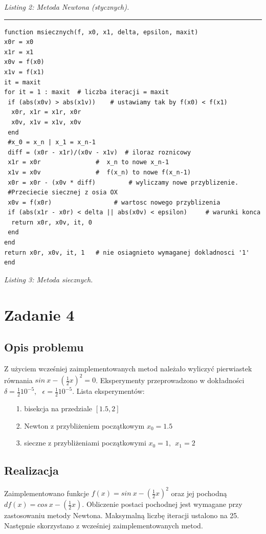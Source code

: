 \documentclass[]{article}
\begin{document}
\textit{Listing 2: Metoda Newtona (stycznych).}
\newpage
\hrule
\begin{lstlisting}
function msiecznych(f, x0, x1, delta, epsilon, maxit)
x0r = x0
x1r = x1
x0v = f(x0)         
x1v = f(x1)  
it = maxit    
for it = 1 : maxit	# liczba iteracji = maxit
 if (abs(x0v) > abs(x1v))    # ustawiamy tak by f(x0) < f(x1) 
  x0r, x1r = x1r, x0r 
  x0v, x1v = x1v, x0v 
 end 
 #x_0 = x_n | x_1 = x_n-1
 diff = (x0r - x1r)/(x0v - x1v)  # iloraz roznicowy
 x1r = x0r               #  x_n to nowe x_n-1
 x1v = x0v               #  f(x_n) to nowe f(x_n-1)
 x0r = x0r - (x0v * diff)         # wyliczamy nowe przyblizenie.
 #Przeciecie siecznej z osia OX 
 x0v = f(x0r)                 # wartosc nowego przyblizenia
 if (abs(x1r - x0r) < delta || abs(x0v) < epsilon)     # warunki konca
  return x0r, x0v, it, 0
 end
end
return x0r, x0v, it, 1   # nie osiagnieto wymaganej dokladnosci '1'
end

\end{lstlisting}
\textit{Listing 3: Metoda siecznych.}
\section{Zadanie 4}
\subsection{Opis problemu}
Z użyciem wcześniej zaimplementowanych metod należało wyliczyć pierwiastek równania $sin\: x - (\frac{1}{2}x)^2 = 0$. Eksperymenty przeprowadzono w dokładności $\delta = \frac{1}{2}10^{-5}, \:\:\: \epsilon = \frac{1}{2}10^{-5}$. Lista eksperymentów:
\begin{itemize}
	\item[1.] bisekcja na przedziale $[1.5, 2]$
	\item[2.] Newton z przybliżeniem początkowym $x_0 = 1.5$ 
	\item[3.] sieczne z przybliżeniami początkowymi $x_0 = 1, \:\: x_1 = 2$ 
\end{itemize}
\subsection{Realizacja}
Zaimplementowano funkcje $f(x) = sin\: x - (\frac{1}{2}x)^2$ oraz jej pochodną $df(x) = cos\: x - (\frac{1}{2}x)$. Obliczenie postaci pochodnej jest wymagane przy zastosowaniu metody Newtona. Maksymalną liczbę iteracji ustalono na 25. Następnie skorzystano z wcześniej zaimplementowanych metod.
\end{document}
